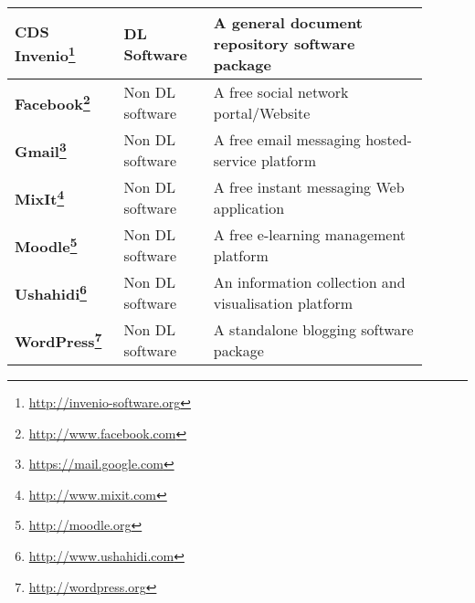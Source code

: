 \begin{longtable}{
>{\arraybackslash}p{0.22\linewidth}|
>{\arraybackslash}p{0.20\linewidth}|
>{\arraybackslash}p{0.48\linewidth}}
 \cline{1-3}

 \textbf{CDS Invenio\footnote{\url{http://invenio-software.org}}}&
 {DL Software}&
 {A general document repository software package}\\

 \cline{1-3}

 \textbf{Facebook\footnote{\url{http://www.facebook.com}}}&
 {Non DL software}&
 {A free social network portal/Website}\\

 \cline{1-3}

 \textbf{Gmail\footnote{\url{https://mail.google.com}}}&
 {Non DL software}&
 {A free email messaging hosted-service platform}\\

 \cline{1-3}

 \textbf{MixIt\footnote{\url{http://www.mixit.com}}}&
 {Non DL software}&
 {A free instant messaging Web application}\\

 \cline{1-3}

 \textbf{Moodle\footnote{\url{http://moodle.org}}}&
 {Non DL software}&
 {A free e-learning management platform}\\

 \cline{1-3}

 \textbf{Ushahidi\footnote{\url{http://www.ushahidi.com}}}&
 {Non DL software}&
 {An information collection and visualisation platform}\\

 \cline{1-3}

 \textbf{WordPress\footnote{\url{http://wordpress.org}}}&
 {Non DL software}&
 {A standalone blogging software package}\\

 \end{longtable}
